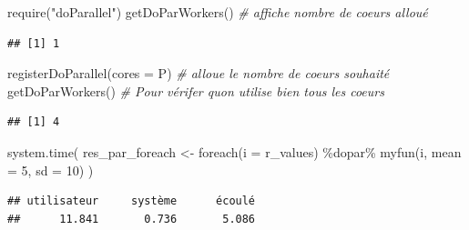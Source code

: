 \documentclass[
]{book}
\newenvironment{Shaded}{\begin{snugshade}}{\end{snugshade}}
\newcommand{\AttributeTok}[1]{\textcolor[rgb]{0.77,0.63,0.00}{#1}}
\newcommand{\CommentTok}[1]{\textcolor[rgb]{0.56,0.35,0.01}{\textit{#1}}}
\newcommand{\DecValTok}[1]{\textcolor[rgb]{0.00,0.00,0.81}{#1}}
\newcommand{\FunctionTok}[1]{\textcolor[rgb]{0.00,0.00,0.00}{#1}}
\newcommand{\NormalTok}[1]{#1}
\newcommand{\OtherTok}[1]{\textcolor[rgb]{0.56,0.35,0.01}{#1}}
\newcommand{\SpecialCharTok}[1]{\textcolor[rgb]{0.00,0.00,0.00}{#1}}
\newcommand{\StringTok}[1]{\textcolor[rgb]{0.31,0.60,0.02}{#1}}
\theoremstyle{definition}
\theoremstyle{definition}
\theoremstyle{definition}
\theoremstyle{definition}
\theoremstyle{remark}
\begin{document}
\begin{Shaded}
\begin{Highlighting}[]
\FunctionTok{require}\NormalTok{(}\StringTok{"doParallel"}\NormalTok{)}
\FunctionTok{getDoParWorkers}\NormalTok{() }\CommentTok{\# affiche nombre de coeurs alloué}
\end{Highlighting}
\end{Shaded}

\begin{verbatim}
## [1] 1
\end{verbatim}

\begin{Shaded}
\begin{Highlighting}[]
\FunctionTok{registerDoParallel}\NormalTok{(}\AttributeTok{cores =}\NormalTok{ P) }\CommentTok{\# alloue le nombre de coeurs souhaité}
\FunctionTok{getDoParWorkers}\NormalTok{() }\CommentTok{\# Pour vérifer qu\textquotesingle{}on utilise bien tous les coeurs}
\end{Highlighting}
\end{Shaded}

\begin{verbatim}
## [1] 4
\end{verbatim}

\begin{Shaded}
\begin{Highlighting}[]
\FunctionTok{system.time}\NormalTok{(}
\NormalTok{  res\_par\_foreach }\OtherTok{\textless{}{-}} \FunctionTok{foreach}\NormalTok{(}\AttributeTok{i =}\NormalTok{ r\_values) }
   \SpecialCharTok{\%dopar\%} \FunctionTok{myfun}\NormalTok{(i, }\AttributeTok{mean =} \DecValTok{5}\NormalTok{, }\AttributeTok{sd =} \DecValTok{10}\NormalTok{)}
\NormalTok{  )}
\end{Highlighting}
\end{Shaded}

\begin{verbatim}
## utilisateur     système      écoulé 
##      11.841       0.736       5.086
\end{verbatim}

\begin{Shaded}
\end{Shaded}
\end{document}
